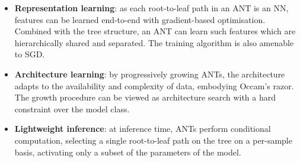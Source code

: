 \begin{itemize}
	\item \textbf{Representation learning}: as each root-to-leaf path in an ANT is an NN, features can be learned end-to-end with gradient-based optimisation. Combined with the tree structure, an ANT can learn such features which are hierarchically shared and separated. The training algorithm is also amenable to SGD.
	
	\item \textbf{Architecture learning}: by progressively growing ANTs, the architecture adapts to the availability and complexity of data, embodying Occam’s razor. %
	The growth procedure can be viewed as architecture search with a hard constraint over the model class.
    \item \textbf{Lightweight inference}: at inference time, ANTs perform conditional computation, selecting a single root-to-leaf path on the tree on a per-sample basis, activating only a subset of the parameters of the model. 
    
\end{itemize}


